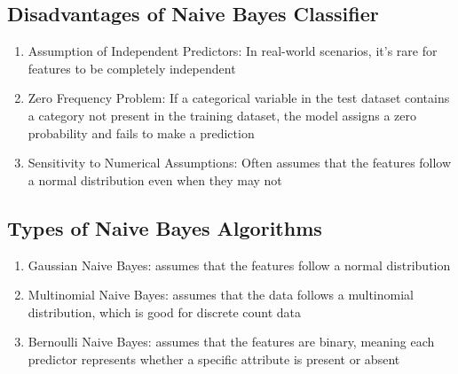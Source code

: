 \documentclass{article}
\begin{document}
\subsection*{Disadvantages of Naive Bayes Classifier}
\begin{enumerate}
    \item Assumption of Independent Predictors: In real-world scenarios, it's rare for features to be completely independent
    \item Zero Frequency Problem: If a categorical variable in the test dataset contains a category not present in the training dataset, the model assigns a zero probability and fails to make a prediction
    \item Sensitivity to Numerical Assumptions: Often assumes that the features follow a normal distribution even when they may not
\end{enumerate}

\subsection*{Types of Naive Bayes Algorithms}
\begin{enumerate}
    \item Gaussian Naive Bayes: assumes that the features follow a normal distribution
    \item Multinomial Naive Bayes: assumes that the data follows a multinomial distribution, which is good for discrete count data
    \item Bernoulli Naive Bayes: assumes that the features are binary, meaning each predictor represents whether a specific attribute is present or absent
\end{enumerate}
\end{document}
